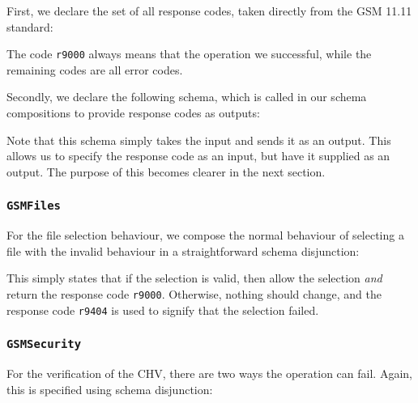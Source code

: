 First, we declare the set of all response codes, taken directly from the GSM 11.11 standard:



The code \texttt{r9000} always means that the operation we successful, while the remaining codes are all error codes.

Secondly, we declare the following schema, which is called in our schema compositions to provide response codes as outputs:



Note that this schema simply takes the input and sends it as an output. This allows us to specify the response code as an input, but have it supplied as an output. The purpose of this becomes clearer in the next section.

\subsubsection*{\texttt{GSMFiles}}

For the file selection behaviour, we compose the normal behaviour of selecting a file with the invalid behaviour in a straightforward schema disjunction:



This simply states that if the selection is valid, then allow the selection \emph{and} return the response code \texttt{r9000}. Otherwise, nothing should change, and the response code \texttt{r9404} is used to signify that the selection failed.

\subsubsection*{\texttt{GSMSecurity}}

For the verification of the CHV, there are two ways the operation can fail. Again, this is specified using schema disjunction:



